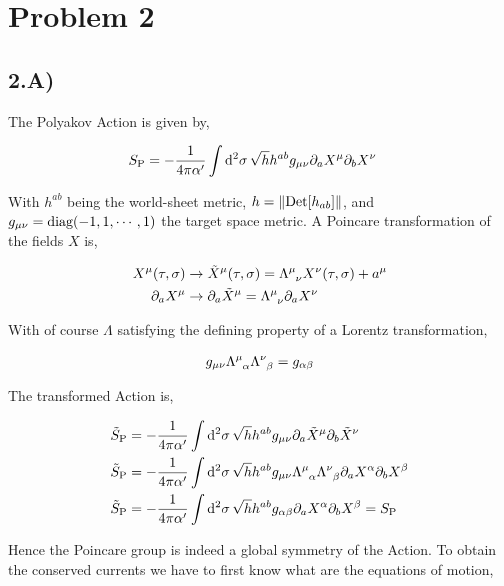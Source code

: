 \section{Problem 2}
\subsection{2.A)}

The Polyakov Action is given by,

\begin{align*}
    S_{\textnormal{P}}&=-\frac{1}{4\pi\alpha'}\int\dd[2]{\sigma}\sqrt{h}h^{ab}g_{\mu\nu}\partial_a X^\mu \partial_b X^\nu
\end{align*}

With $h^{ab}$ being the world-sheet metric, $h=\norm{\textup{Det} \qty[h_{ab}]}$, and $g_{\mu\nu}=\textnormal{diag}\qty(-1,1,\cdots,1)$ the 
target space metric. A Poincare transformation of the fields $X$ is,

\begin{align*}
    X^\mu\qty(\tau,\sigma)&\rightarrow\tilde X^\mu\qty(\tau,\sigma)=\tensor{\Lambda}{^\mu_\nu}X^\nu\qty(\tau,\sigma)+a^\mu\\
    \partial_a X^\mu&\rightarrow\partial_a\tilde X^\mu=\tensor{\Lambda}{^\mu_\nu}\partial_a X^\nu
\end{align*}

With of course $\Lambda$ satisfying the defining property of a Lorentz transformation,

\begin{align*}
    g_{\mu\nu}\tensor{\Lambda}{^\mu_\alpha}\tensor{\Lambda}{^\nu_\beta}=g_{\alpha\beta}
\end{align*}

The transformed Action is,

\begin{align*}
    \tilde S_{\textnormal{P}}&=-\frac{1}{4\pi\alpha'}\int\dd[2]{\sigma}\sqrt{h}h^{ab}g_{\mu\nu}\partial_a \tilde X^\mu \partial_b \tilde X^\nu\\
    \tilde S_{\textnormal{P}}&=-\frac{1}{4\pi\alpha'}\int\dd[2]{\sigma}\sqrt{h}h^{ab}g_{\mu\nu}\tensor{\Lambda}{^\mu_\alpha}\tensor{\Lambda}{^\nu_\beta}\partial_a  X^\alpha \partial_b X^\beta\\
    \tilde S_{\textnormal{P}}&=-\frac{1}{4\pi\alpha'}\int\dd[2]{\sigma}\sqrt{h}h^{ab}g_{\alpha\beta}\partial_a  X^\alpha \partial_b X^\beta=S_{\textnormal{P}}
\end{align*}

Hence the Poincare group is indeed a global symmetry of the Action. To obtain the conserved currents we have to first know what are the 
equations of motion,

